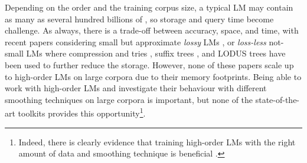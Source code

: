 Depending on the order and the training corpus size, a typical \ngram LM may contain as many as several hundred billions of \ngrams \cite{brants2007large},
so storage and query time become challenge.
%
As always, there is a trade-off between accuracy, space, and time, with recent papers considering small but approximate  \emph{lossy} LMs 
\cite{Chazelle:2004:BFE:982792.982797,guthrie2010storing},
or \emph{loss-less}  not-small LMs \cite{stolcke2011srilm} where compression and tries 
\cite{Germann:2009:TPT:1621947.1621952,heafield2011kenlm,pauls2011faster}, 
suffix trees \cite{kennington2012suffix}, and LODUS trees 
\cite{sall11,DBLP:conf/acl/WatanabeTI09}  
have been used to further reduce the storage.
However, none of these papers scale up to high-order  
\ngram LMs on large corpora due to their  memory footprints.
%
% 
Being able to work with high-order  LMs and investigate their behaviour 
with different smoothing techniques on large corpora is important, but none of the
state-of-the-art toolkits provides this opportunity\footnote{
Indeed, there is clearly evidence that training high-order \ngram
LMs with the right amount of data and smoothing technique is beneficial \cite{wood2011sequence}.
}. 

%
%
%
%
 
